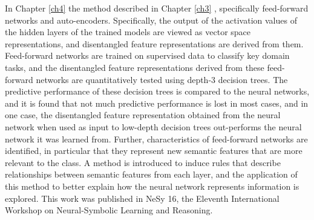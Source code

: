 In Chapter \ref{ch4} the method described in Chapter \ref{ch3} , specifically feed-forward networks and auto-encoders. Specifically, the output of the activation values of the hidden layers  of the trained models are viewed as vector space representations,  and  disentangled feature representations are derived from them. Feed-forward networks are trained on supervised data to classify key domain tasks, and the disentangled feature representations derived from these feed-forward networks are quantitatively tested using depth-3 decision trees. The predictive performance of these decision trees is compared to the neural networks, and it is found that not much predictive performance is lost in most cases, and in one case, the disentangled feature representation obtained from the neural network when used as input to low-depth decision trees  out-performs the neural network it was learned from.  Further, characteristics of feed-forward networks are identified, in particular that they represent new semantic features that are more relevant to the class.  A method is introduced to induce rules that describe relationships between semantic features from each layer, and the application of this method to  better explain how the neural network represents information is explored. This work was published in NeSy 16, the Eleventh International Workshop on Neural-Symbolic Learning and Reasoning.





